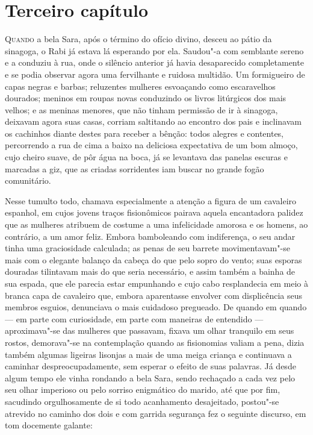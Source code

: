 \chapter{Terceiro capítulo}

\textsc{Quando} a bela Sara, após o término do ofício divino, desceu ao pátio da
sinagoga, o Rabi já estava lá esperando por ela. Saudou"-a com
semblante sereno e a conduziu à rua, onde o silêncio anterior já havia
desaparecido completamente e se podia observar agora uma fervilhante e
ruidosa multidão. Um formigueiro de capas negras e barbas; reluzentes
mulheres esvoaçando como escaravelhos dourados; meninos em roupas novas
conduzindo os livros litúrgicos dos mais velhos; e as meninas menores,
que não tinham permissão de ir à sinagoga, deixavam agora suas casas,
corriam saltitando ao encontro dos pais e inclinavam os cachinhos
diante destes para receber a bênção: todos alegres e contentes,
percorrendo a rua de cima a baixo na deliciosa expectativa de um bom
almoço, cujo cheiro suave, de pôr água na boca, já se levantava das
panelas escuras e marcadas a giz, que as criadas sorridentes iam buscar
no grande fogão comunitário.

Nesse tumulto todo, chamava especialmente a atenção a figura de um
cavaleiro espanhol, em cujos jovens traços fisionômicos pairava aquela
encantadora palidez que as mulheres atribuem de costume a uma
infelicidade amorosa e os homens, ao contrário, a um amor feliz. Embora
bamboleando com indiferença, o seu andar tinha uma graciosidade
calculada; as penas de seu barrete movimentavam"-se mais com o
elegante balanço da cabeça do que pelo sopro do vento; suas esporas
douradas tilintavam mais do que seria necessário, e assim também a
bainha de sua espada, que ele parecia estar empunhando e cujo cabo
resplandecia em meio à branca capa de cavaleiro que, embora aparentasse
envolver com displicência seus membros esguios, denunciava o mais
cuidadoso pregueado. De quando em quando --- em parte com curiosidade, em
parte com maneiras de entendido --- aproximava"-se das mulheres que
passavam, fixava um olhar tranquilo em seus rostos, demorava"-se na
contemplação quando as fisionomias valiam a pena, dizia também algumas
ligeiras lisonjas a mais de uma meiga criança e continuava a caminhar
despreocupadamente, sem esperar o efeito de suas palavras. Já desde
algum tempo ele vinha rondando a bela Sara, sendo rechaçado a cada vez
pelo seu olhar imperioso ou pelo sorriso enigmático do marido, até que
por fim, sacudindo orgulhosamente de si todo acanhamento desajeitado,
postou"-se atrevido no caminho dos dois e com garrida segurança fez o
seguinte discurso, em tom docemente galante: 

